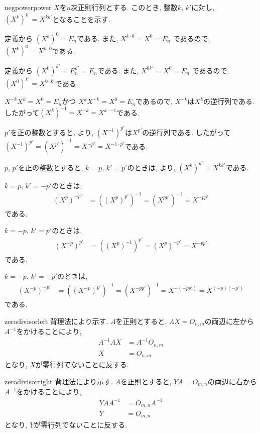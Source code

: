   
\begin{proofof*}{negpower}{power}
  $X$を$n$次正則行列とする.
  このとき, 整数$k$, $k'$に対し, $(X^{k})^{k'}=X^{kk'}$となることを示す.

  定義から
  $(X^{k})^{0}=E_n$である.
  また,
  $X^{k\cdot 0}=X^0=E_n$
  であるので, $(X^{k})^{0}=X^{k\cdot0}$である.

  定義から
  $(X^{0})^{k'}=E_n^{k'}=E_n$である.
  また,
  $X^{0k'}=X^0=E_n$
  であるので, $(X^{0})^{k'}=X^{0\cdot k'}$である.

  
  $X^{-k}X^{k}=X^0=E_n$かつ
  $X^{k}X^{-k}=X^0=E_n$であるので,
  $X^{-k}$は$X^k$の逆行列である.
  したがって$(X^{k})^{-1}=X^{-k}=X^{k\cdot -1}$である.

  $p'$を正の整数とすると,
  より,
  $(X^{-1})^{p'}$は$X^{p'}$の逆行列である.
  したがって$(X^{-1})^{p'}=(X^{p'})^{-1}=X^{-p'}=X^{-1\cdot p'}$である.

  $p$, $p'$を正の整数とすると,
  $k=p$, $k'=p'$のときは,
  より,
  $(X^{k})^{k'}=X^{kk'}$である.

  $k=p$, $k'=-p'$のときは,
  \begin{align*}
    (X^{p})^{-p'}&=((X^{p})^{p'})^{-1}=(X^{pp'})^{-1}=X^{-pp'}
  \end{align*}
  である.

  $k=-p$, $k'=p'$のときは,
  \begin{align*}
    (X^{-p})^{p'}&=((X^{p})^{-1})^{p'}=(X^{p})^{-p'}=X^{-pp'}
  \end{align*}
  である.

  $k=-p$, $k'=-p'$のときは,
  \begin{align*}
    (X^{-p})^{-p'}&=((X^{-p})^{p'})^{-1}=(X^{-pp'})^{-1}=X^{-(-pp')}=X^{(-p)(-p')}
  \end{align*}
  である.

\end{proofof*}

\begin{proofof*}{zerodivisor}{left}
  背理法により示す.
  $A$を正則とすると,
  $AX=O_{n,m}$の両辺に左から$A^{-1}$をかけることにより,
  \begin{align*}
    A^{-1}AX&=A^{-1}O_{n,m}\\
    X&=O_{n,m}
  \end{align*}
  となり, $X$が零行列でないことに反する.
\end{proofof*}

\begin{proofof*}{zerodivisor}{right}
  背理法により示す.
  $A$を正則とすると,
  $YA=O_{m,n}$の両辺に右から$A^{-1}$をかけることにより,
  \begin{align*}
    YAA^{-1}&=O_{m,n}A^{-1}\\
    Y&=O_{m,n}
  \end{align*}
  となり, $Y$が零行列でないことに反する.
\end{proofof*}


